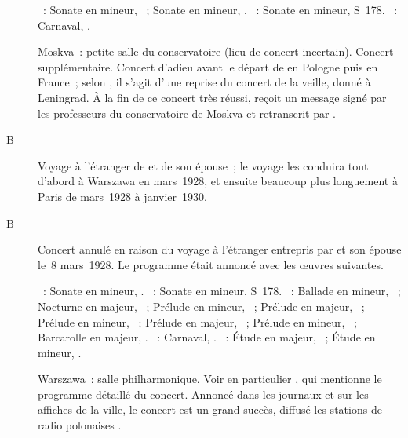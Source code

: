 \begin{description}
 \textsc{\Beethoven{}}~: Sonate en \kC mineur, ~; Sonate en \kF
 mineur, .
 \textsc{\Liszt{}}~: Sonate en \kB mineur, S~178.
 \textsc{\Schumann{}}~: Carnaval, .
 \item[\DateWithWeekDay{1928-03-07}]
 Moskva~: petite salle du conservatoire (lieu de concert incertain).
 Concert supplémentaire.
 Concert d'adieu avant le départ de \VSofronitsky{} en Pologne puis en
 France~; selon \citet[p.~148]{Nekrasova08}, il s'agit d'une reprise du
 concert de la veille, donné à Leningrad.
 À la fin de ce concert très réussi, \Sofronitsky{} reçoit un message signé
 par les professeurs du conservatoire de Moskva et retranscrit par
 \citet[p.~31]{Sofronitsky82a}.
 \item[B\DateWithWeekDay{1928-03-08}]
 Voyage à l'étranger de \VSofronitsky{} et de son épouse~; le voyage les
 conduira tout d'abord à Warszawa en mars~1928, et ensuite beaucoup plus
 longuement à Paris de mars~1928 à janvier~1930.
 \item[B\DateWithWeekDay{1928-03-13}]
 Concert annulé en raison du voyage à l'étranger entrepris par
 \VSofronitsky{} et son épouse le~8 mars~1928.
 Le programme était annoncé avec les œuvres suivantes.

 \textsc{\Beethoven{}}~: Sonate en \kC mineur, .
 \textsc{\Liszt{}}~: Sonate en \kB mineur, S~178.
 \textsc{\Chopin{}}~: Ballade en \kG mineur, ~; Nocturne en \kF
 majeur,  ~; Prélude en \kB \Flat mineur, 
 ~; Prélude en \kE \Flat majeur,  ~; Prélude
 en \kC mineur,  ~; Prélude en \kF majeur, 
 ~; Prélude en \kD mineur,  ~; Barcarolle en
 \kF \Sharp majeur, .
 \textsc{\Schumann{}}~: Carnaval, .
 \textsc{\Scriabine{}}~: Étude en \kD \Flat majeur,  ~;
 Étude en \kD \Sharp mineur,  .
 \item[\DateWithWeekDay{1928-03-20}]
 Warszawa~: salle philharmonique.
 Voir en particulier \citet[p.~\hbox{32-33}]{Sofronitsky82a}, qui mentionne
 le programme détaillé du concert.
 Annoncé dans les journaux et sur les affiches de la ville, le concert est
 un grand succès, diffusé \via{} les stations de radio polonaises
 \citep[voir][p.~148]{Nekrasova08}.


\end{description}

